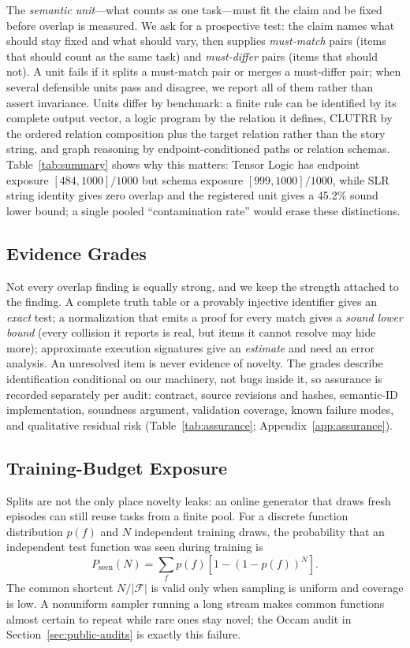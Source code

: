 \documentclass[twoside,11pt]{article}
\begin{document}
The \emph{semantic unit}---what counts as one task---must fit the claim and be
fixed before overlap is measured.  We ask for a prospective test: the claim
names what should stay fixed and what should vary, then supplies
\emph{must-match} pairs (items that should count as the same task) and
\emph{must-differ} pairs (items that should not).  A unit fails if it splits
a must-match pair or merges a must-differ pair; when several defensible units
pass and disagree, we report all of them rather than assert invariance.
Units differ by benchmark: a finite rule can be identified by its complete
output vector, a logic program by the relation it defines, CLUTRR by the
ordered relation composition plus the target relation rather than the story
string, and graph reasoning by endpoint-conditioned paths or relation
schemas.  Table~\ref{tab:summary} shows why this matters: Tensor Logic has
endpoint exposure $[484,1000]/1000$ but schema exposure $[999,1000]/1000$,
while SLR string identity gives zero overlap and the registered unit gives a
45.2\% sound lower bound; a single pooled ``contamination rate'' would erase
these distinctions.

\subsection{Evidence Grades}

Not every overlap finding is equally strong, and we keep the strength
attached to the finding.  A complete truth table or a provably injective
identifier gives an \emph{exact} test; a normalization that emits a proof for
every match gives a \emph{sound lower bound} (every collision it reports is
real, but items it cannot resolve may hide more); approximate execution
signatures give an \emph{estimate} and need an error analysis.  An unresolved
item is never evidence of novelty.  The grades describe identification
conditional on our machinery, not bugs inside it, so assurance is recorded
separately per audit: contract, source revisions and hashes, semantic-ID
implementation, soundness argument, validation coverage, known failure modes,
and qualitative residual risk (Table~\ref{tab:assurance};
Appendix~\ref{app:assurance}).

\subsection{Training-Budget Exposure}

Splits are not the only place novelty leaks: an online generator that draws
fresh episodes can still reuse tasks from a finite pool.  For a discrete
function distribution $p(f)$ and $N$ independent training draws, the
probability that an independent test function was seen during training is
\begin{equation}
P_{\mathrm{seen}}(N)
=
\sum_f p(f)\left[1-(1-p(f))^N\right].
\label{eq:coverage}
\end{equation}
The common shortcut $N/|\mathcal F|$ is valid only when sampling is uniform
and coverage is low.  A nonuniform sampler running a long stream makes
common functions almost certain to repeat while rare ones stay novel; the
Occam audit in Section~\ref{sec:public-audits} is exactly this failure.
\end{document}
